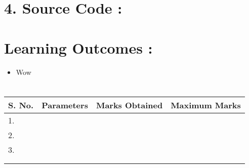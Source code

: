 \documentclass[14pt]{extarticle}
\begin{document}
\newpage
\section*{\normalsize 4. Source Code :}





\newpage
\section*{\normalsize Learning Outcomes :}

  \begin{itemize}
    \item Wow
  \end{itemize}

\section*{}

\begin{center}

\begin{tabular}{ |p{2.5cm}|p{4cm}|p{5cm}|p{5cm}|}
 \hline
 S. No. & Parameters & Marks Obtained & Maximum Marks \\
 \hline
 1.&&&\\
 \hline
 2.&&&\\
 \hline
 3.&&&\\
 \hline
 &&&\\
 &&&\\
 \hline
\end{tabular}
\end{center}
\end{document}
